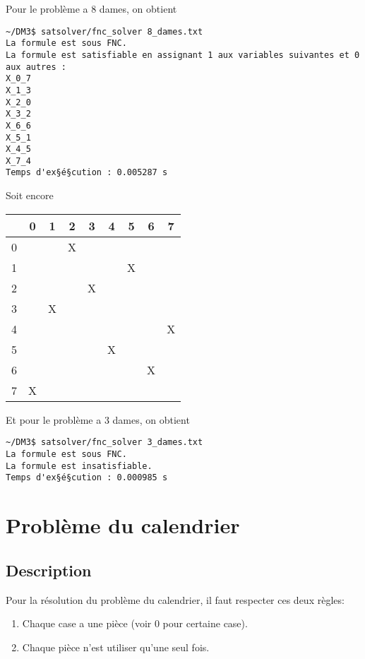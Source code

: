    Pour le problème a 8 dames, on obtient
    \begin{lstlisting}
~/DM3$ satsolver/fnc_solver 8_dames.txt 
La formule est sous FNC.
La formule est satisfiable en assignant 1 aux variables suivantes et 0 aux autres :
X_0_7
X_1_3
X_2_0
X_3_2
X_6_6
X_5_1
X_4_5
X_7_4
Temps d'ex§é§cution : 0.005287 s
    \end{lstlisting}
    Soit encore
    \begin{center}
        \begin{tabular}{| c || *{8}{c |}}
        \hline
          & 0 & 1 & 2 & 3 & 4 & 5 & 6 & 7 \\
        \hline
        \hline
        0 &   &   & X &   &   &   &   &   \\
        \hline
        1 &   &   &   &   &   & X &   &   \\
        \hline
        2 &   &   &   & X &   &   &   &   \\
        \hline
        3 &   & X &   &   &   &   &   &   \\
        \hline
        4 &   &   &   &   &   &   &   & X \\
        \hline
        5 &   &   &   &   & X &   &   &   \\
        \hline
        6 &   &   &   &   &   &   & X &   \\
        \hline
        7 & X &   &   &   &   &   &   &   \\
        \hline
        \end{tabular}
    \end{center}
    
    Et pour le problème a 3 dames, on obtient
    \begin{lstlisting}
~/DM3$ satsolver/fnc_solver 3_dames.txt 
La formule est sous FNC.
La formule est insatisfiable.
Temps d'ex§é§cution : 0.000985 s
    \end{lstlisting}
    
    \section{Problème du calendrier}
    \subsection*{Description}
    Pour la résolution du problème du calendrier, il faut respecter ces deux règles:
    \begin{enumerate}
        \item Chaque case a une pièce (voir 0 pour certaine case).
        \item Chaque pièce n'est utiliser qu'une seul fois.
    \end{enumerate}
    
